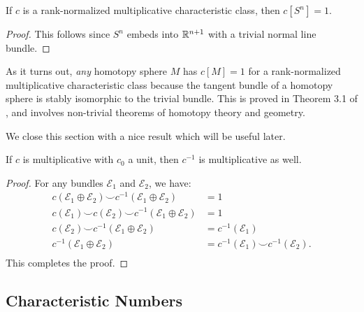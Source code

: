 \begin{corollary}
	If $c$ is a rank-normalized multiplicative characteristic class, then $c[S^n]=1$.
\end{corollary}
\begin{proof}
	This follows since $S^n$ embeds into $\mathbb{R}^{n+1}$ with a trivial normal line bundle.
\end{proof}

\begin{remark*}
	As it turns out, \emph{any} homotopy sphere $M$ has $c[M]=1$ for a rank-normalized multiplicative characteristic class because the tangent bundle of a homotopy sphere is stably isomorphic to the trivial bundle. This is proved in Theorem 3.1 of \cite{milnorkervaire1963groups}, and involves non-trivial theorems of homotopy theory and geometry.
\end{remark*}

We close this section with a nice result which will be useful later.
\begin{proposition}\label{prop:multiplicative-inverse-is-multiplicative}
	If $c$ is multiplicative with $c_0$ a unit, then $c^{-1}$ is multiplicative as well.
\end{proposition}
\begin{proof}
	For any bundles $\mathcal{E}_1$ and $\mathcal{E}_2$, we have:
	\begin{equation}
		\begin{aligned}
			c(\mathcal{E}_1\oplus \mathcal{E}_2)\smile c^{-1}(\mathcal{E}_1\oplus \mathcal{E}_2)    & = 1                                                  \\
			c(\mathcal{E}_1)\smile c(\mathcal{E}_2)\smile c^{-1}(\mathcal{E}_1\oplus \mathcal{E}_2) & = 1                                                  \\
			c(\mathcal{E}_2)\smile
			c^{-1}(\mathcal{E}_1\oplus \mathcal{E}_2)                                               & = c^{-1}(\mathcal{E}_1)                              \\
			c^{-1}(\mathcal{E}_1\oplus \mathcal{E}_2)                                               & = c^{-1}(\mathcal{E}_1)\smile c^{-1}(\mathcal{E}_2). \\
		\end{aligned}
	\end{equation}
	This completes the proof.
\end{proof}

\subsection{Characteristic Numbers}


